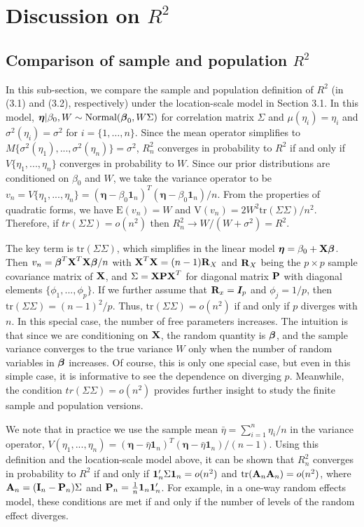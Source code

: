 \documentclass[12pt]{article}
\begin{document}
\section{Discussion on $R^2$}
\subsection{Comparison of sample and population $R^2$}
In this sub-section, we compare the sample and population definition of $R^2$ (in (3.1) and (3.2), respectively) under the location-scale model in Section 3.1.  In this model,
$\boldsymbol{\eta}|\beta_0,W\sim\mbox{Normal}(\mbox{\boldmath $\beta$}_0,W\Sigma)$ for correlation matrix $\Sigma$ and $\mu(\eta_i)=\eta_i$ and $\sigma^2(\eta_i)=\sigma^2$ for $i=\{1,\dots,n\}$.  Since the mean operator simplifies to $M\{\sigma^2(\eta_1),...,\sigma^2(\eta_n)\} = \sigma^2$, $R^2_n$ converges in probability to $R^2$ if and only if $V\{\eta_1,...,\eta_n\}$ converges in probability to $W$. Since our prior distributions are conditioned on $\beta_0$ and $W$, we take the variance operator to be
$ v_n=V\{\eta_1,...,\eta_n\} = (\boldsymbol{\eta}-\beta_0\boldsymbol{1}_n)^T(\boldsymbol{\eta}-\beta_0\boldsymbol{1}_n)/n$.  From the properties of quadratic forms, we have $\mbox{E}(v_n)=W$ and $\mbox{V}(v_n)=2W^2\mbox{tr}(\Sigma\Sigma)/n^2$.  Therefore, if $tr(\Sigma\Sigma)=o(n^2)$ then $R_n^2\rightarrow W/(W+\sigma^2)=R^2$.

The key term is $\mbox{tr}(\Sigma\Sigma)$, which simplifies in the linear model $\boldsymbol{\eta}=\beta_0+\mbox{\bf X}\mbox{\boldmath $\beta$}$.  Then $v_n=\mbox{\boldmath $\beta$}^T\mbox{\bf X}^T\mbox{\bf X}\mbox{\boldmath $\beta$}/n$ with $\mbox{\bf X}^T\mbox{\bf X}=(n-1)\mbox{\bf R}_X$ and $\mbox{\bf R}_X$ being the $p\times p$ sample covariance matrix of $\mbox{\bf X}$, and $\Sigma = \mbox{\bf X}\mbox{\bf P}\mbox{\bf X}^T$ for diagonal matrix $\mbox{\bf P}$ with diagonal elements $\{\phi_1,...,\phi_p\}$.  If we further assume that $\mbox{\bf R}_x = \boldsymbol{I}_p$ and $\phi_j=1/p$, then $\mbox{tr}(\Sigma\Sigma) = (n-1)^2/p$.  Thus, $\mbox{tr}(\Sigma\Sigma)=o(n^2)$ if and only if $p$ diverges with $n$.  In this special case, the number of free parameters increases. The intuition is that since we are conditioning on $\mbox{\bf X}$, the random quantity is $\mbox{\boldmath $\beta$}$, and the sample variance converges to the true variance $W$ only when the number of random variables in $\mbox{\boldmath $\beta$}$ increases. Of course, this is only one special case, but even in this simple case, it is informative to see the dependence on diverging $p$. Meanwhile, the condition $tr(\Sigma\Sigma)=o(n^2)$ provides further insight to study the finite sample and population versions.

We note that in practice we use the sample mean $\bar{\eta} = \sum_{i=1}^n\eta_i/n$ in the variance operator, $V(\eta_1,...,\eta_n) = (\boldsymbol{\eta}-\bar{\eta}\boldsymbol{1}_n)^T(\boldsymbol{\eta}-\bar{\eta}\boldsymbol{1}_n)/(n-1)$. Using this definition and the location-scale model above, it can be shown that $R^2_n$ converges in probability to $R^2$ if and only if ${\bf1}_n'\Sigma{\bf1}_n=o(n^2)$ and $\mbox{tr}(\mbox{\bf A}_n\mbox{\bf A}_n)=o(n^2)$, where $\mbox{\bf A}_n=(\mbox{\bf I}_n-\mbox{\bf P}_n)\Sigma$ and $\mbox{\bf P}_n=\frac1n{\bf 1}_n{\bf 1}_n'$. For example, in a one-way random effects model, these conditions are met if and only if the number of levels of the random effect diverges.
\end{document}
